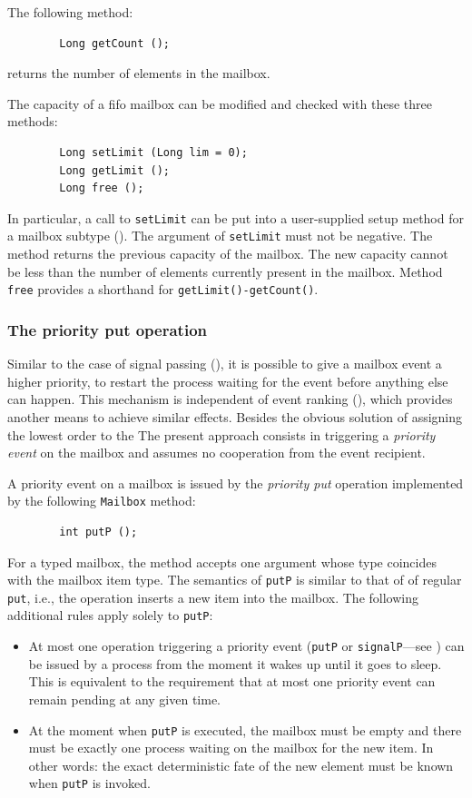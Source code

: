 \medskip

\noindent
The following method:
\begin{verbatim}
        Long getCount ();
\end{verbatim}
returns the number of elements in the mailbox.

The capacity of a fifo
mailbox can be modified and checked with these three methods:
\begin{verbatim}
        Long setLimit (Long lim = 0);
        Long getLimit ();
        Long free ();
\end{verbatim}
In particular, a call to {\tt setLimit} can be put into a user-supplied
setup method for a mailbox subtype ().
The argument of {\tt setLimit} must not be negative.
The method returns the previous capacity of the mailbox.
The new capacity cannot be less than the number of elements currently
present in the mailbox.
Method {\tt free} provides a shorthand for {\tt getLimit()-getCount()}.

\subsubsection{The priority put operation}
\label{rm_mb_fi_pp}

Similar to the case of signal passing (), it is
possible to give a mailbox event
a higher priority, to restart the process waiting for the event
before anything else can happen.
This mechanism is independent of event ranking (), which
provides another means to achieve similar effects.
Besides the obvious solution of assigning the lowest order to the
The present approach consists in triggering a
{\em priority event\/} on the mailbox and
assumes no cooperation from the event recipient.

A priority event on a mailbox is issued by the {\em priority put\/}
operation implemented by the following {\tt Mailbox} method:
\begin{verbatim}
        int putP ();
\end{verbatim}
For a typed mailbox, the method accepts one argument whose type coincides with
the mailbox item type.
The semantics of {\tt putP} is
similar to that of of regular {\tt put}, i.e.,
the operation inserts a new item into the mailbox.
The following additional rules apply solely to {\tt putP}:
\begin{itemize}
\item
At most one operation triggering a priority event ({\tt putP} or
{\tt signalP}---see )
can be issued by a process from the moment
it wakes up until it goes to sleep.
This is equivalent to the requirement that
at most one priority event can remain pending at any given time.
\item
At the moment when {\tt putP} is executed, the mailbox must be empty and
there must be exactly one process waiting on the mailbox for the new item.
In other words: the exact deterministic
fate of the new element must be known when {\tt putP} is invoked.
\end{itemize}


